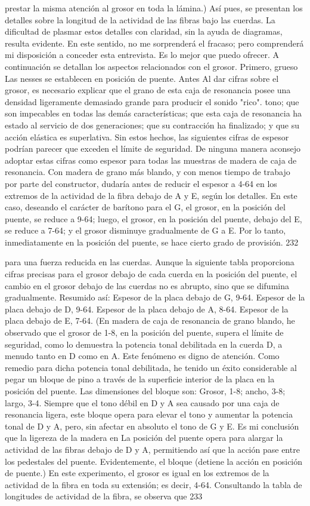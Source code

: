 prestar la misma atención al grosor en toda la
lámina.)
Así pues, se presentan los detalles sobre la longitud de la actividad de las fibras bajo las cuerdas. La dificultad de plasmar estos detalles con claridad, sin la ayuda de diagramas, resulta evidente. En este sentido, no me sorprenderá el fracaso; pero comprenderá mi disposición a conceder esta entrevista. Es lo mejor que puedo ofrecer.
A continuación se detallan los aspectos relacionados con el grosor.	Primero, grueso
Las nesses se establecen en posición de puente.	Antes
Al dar cifras sobre el grosor, es necesario explicar que el grano de esta caja de resonancia posee una densidad ligeramente demasiado grande para producir el sonido "rico".
tono; que son impecables en todas las demás características; que esta caja de resonancia ha estado al servicio de dos generaciones; que su contracción ha finalizado; y que su acción elástica es superlativa. Sin estos hechos, las siguientes cifras de espesor podrían parecer que exceden el límite de seguridad. De ninguna manera aconsejo adoptar estas cifras como espesor para todas las muestras de madera de caja de resonancia. Con madera de grano más blando, y con menos tiempo de trabajo por parte del constructor, dudaría antes de reducir el espesor a 4-64 en los extremos de la actividad de la fibra debajo de A y E, según los detalles.
En este caso, deseando el carácter de barítono para el G, el grosor, en la posición del puente, se reduce a 9-64; luego, el grosor, en la posición del puente, debajo del E, se reduce a 7-64; y el grosor disminuye gradualmente de G a E. Por lo tanto, inmediatamente en la posición del puente, se hace cierto grado de provisión.
232

para una fuerza reducida en las cuerdas. Aunque la siguiente tabla proporciona cifras precisas para el grosor debajo de cada cuerda en la posición del puente, el cambio en el grosor debajo de las cuerdas no es abrupto, sino que se difumina gradualmente.
Resumido así:
Espesor de la placa debajo de G, 9-64. Espesor de la placa debajo de D, 9-64. Espesor de la placa debajo de A, 8-64. Espesor de la placa debajo de E, 7-64.
(En madera de caja de resonancia de grano blando, he observado que el grosor de 1-8, en la posición del puente, supera el límite de seguridad, como lo demuestra la potencia tonal debilitada en la cuerda D, a menudo tanto en D como en A. Este fenómeno es digno de atención. Como remedio para dicha potencia tonal debilitada, he tenido un éxito considerable al pegar un bloque de pino a través de la superficie interior de la placa en la posición del puente. Las dimensiones del bloque son: Grosor, 1-8; ancho, 3-8; largo, 3-4. Siempre que el tono débil en D y A sea causado por una caja de resonancia ligera, este bloque opera para elevar el tono y aumentar la potencia tonal de D y A, pero, sin afectar en absoluto el tono de G y E. Es mi conclusión que la ligereza de la madera en
La posición del puente opera para alargar la actividad de las fibras debajo de D y A, permitiendo así que la acción pase entre los pedestales del puente. Evidentemente, el bloque
(detiene la acción en posición de puente.)
En este experimento, el grosor es igual en los extremos de la actividad de la fibra en toda su extensión; es decir, 4-64. Consultando la tabla de longitudes de actividad de la fibra, se observa que
233

